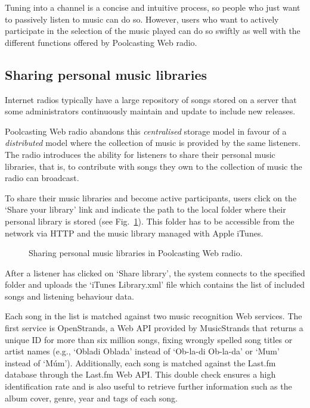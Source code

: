 Tuning into a channel is a concise and intuitive process, so people who just want to passively listen to music can do so.
However, users who want to actively participate in the selection of the music played can do so swiftly as well with the different functions offered by Poolcasting Web radio.

\subsection{Sharing personal music libraries}

Internet radios typically have a large repository of songs stored on a server that some administrators continuously maintain and update to include new releases.

Poolcasting Web radio abandons this \emph{centralised} storage model in favour of a \emph{distributed} model where the collection of music is provided by the same listeners.
The radio introduces the ability for listeners to share their personal music libraries, that is, to contribute with songs they own to the collection of music the radio can broadcast.

To share their music libraries and become active participants, users click on the `Share your library' link and indicate the path to the local folder where their personal library is stored (see Fig.~\ref{fig:share}). 
This folder has to be accessible from the network via HTTP and the music library managed with Apple iTunes.
%
\begin{figure}[bthp]
\centering \setlength{\abovecaptionskip}{3pt}
\caption{Sharing personal music libraries in Poolcasting Web radio.}
\label{fig:share}
\end{figure}
%
After a listener has clicked on `Share library', the system connects to the specified folder and uploads the `iTunes Library.xml' file which contains the list of included songs and listening behaviour data.

Each song in the list is matched against two music recognition Web services.
The first service is OpenStrands, a Web API provided by MusicStrands that returns a unique ID for more than six million songs, fixing wrongly spelled song titles or artist names (e.g., `Obladi Oblada' instead of `Ob-la-di Ob-la-da' or `Mum' instead of `M\'{u}m'). 
Additionally, each song is matched against the Last.fm database through the Last.fm Web API. 
This double check ensures a high identification rate and is also useful to retrieve further information such as the album cover, genre, year and tags of each song.


